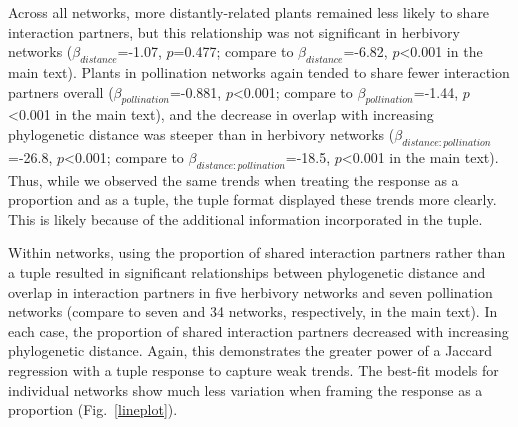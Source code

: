 \documentclass[12pt]{article}
\begin{document}
\begin{spacing}{1.5}
    Across all networks, more distantly-related plants remained less likely
    to share interaction partners, but this relationship was not significant 
    in herbivory networks ($\beta_{distance}$=-1.07, $p$=0.477; compare to 
    $\beta_{distance}$=-6.82, $p$\textless0.001 in the main text). Plants in pollination networks again tended to share fewer interaction partners overall ($\beta_{pollination}$=-0.881, $p$\textless0.001; compare to $
    \beta_{pollination}$=-1.44, $p$\textless0.001 in the main text), and the decrease in overlap with increasing phylogenetic distance was steeper than in herbivory networks ($\beta_{distance:pollination}$=-26.8, $p$\textless0.001; compare to $\beta_{distance:pollination}$=-18.5, $p$\textless0.001 in the main text). Thus, while we observed the same trends when treating the response as a proportion and as a tuple, the tuple format displayed these trends more clearly. This is likely because of the additional information incorporated in the tuple.


    Within networks, using the proportion of shared interaction partners rather than a tuple resulted in significant relationships between phylogenetic distance and overlap in interaction partners in five herbivory networks and seven pollination networks (compare to seven and 34 networks, respectively, in the main text). In each case, the proportion of shared interaction partners decreased with increasing phylogenetic distance. Again, this demonstrates the greater power of a Jaccard regression with a tuple response to capture weak trends. The best-fit models for individual networks show much less variation when framing the response as a proportion (Fig.~\ref{lineplot}).



\end{spacing}
\end{document}
